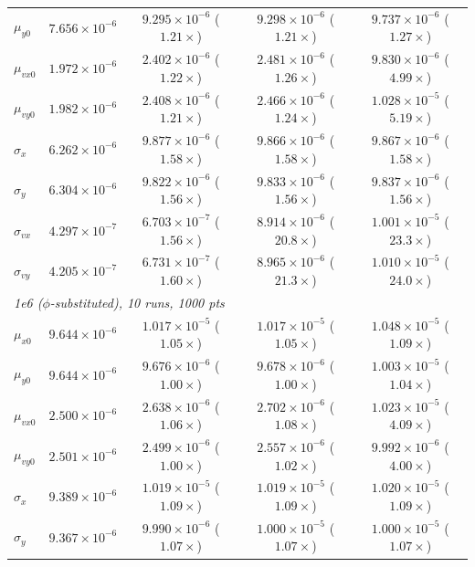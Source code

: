 \documentclass[11pt,a4paper]{article}
\begin{document}
\begin{table}[h]
\begin{tabular}{lcccc}
$\mu_{y0}$    & $7.656\times10^{-6}$ & $9.295\times10^{-6}$ ($1.21\times$) & $9.298\times10^{-6}$ ($1.21\times$) & $9.737\times10^{-6}$ ($1.27\times$) \\
$\mu_{vx0}$   & $1.972\times10^{-6}$ & $2.402\times10^{-6}$ ($1.22\times$) & $2.481\times10^{-6}$ ($1.26\times$) & $9.830\times10^{-6}$ ($\mathbf{4.99\times}$) \\
$\mu_{vy0}$   & $1.982\times10^{-6}$ & $2.408\times10^{-6}$ ($1.21\times$) & $2.466\times10^{-6}$ ($1.24\times$) & $1.028\times10^{-5}$ ($\mathbf{5.19\times}$) \\
$\sigma_x$    & $6.262\times10^{-6}$ & $9.877\times10^{-6}$ ($1.58\times$) & $9.866\times10^{-6}$ ($1.58\times$) & $9.867\times10^{-6}$ ($1.58\times$) \\
$\sigma_y$    & $6.304\times10^{-6}$ & $9.822\times10^{-6}$ ($1.56\times$) & $9.833\times10^{-6}$ ($1.56\times$) & $9.837\times10^{-6}$ ($1.56\times$) \\
$\sigma_{vx}$ & $4.297\times10^{-7}$ & $6.703\times10^{-7}$ ($1.56\times$) & $8.914\times10^{-6}$ ($\mathbf{20.8\times}$) & $1.001\times10^{-5}$ ($\mathbf{23.3\times}$) \\
$\sigma_{vy}$ & $4.205\times10^{-7}$ & $6.731\times10^{-7}$ ($1.60\times$) & $8.965\times10^{-6}$ ($\mathbf{21.3\times}$) & $1.010\times10^{-5}$ ($\mathbf{24.0\times}$) \\
\midrule
\multicolumn{5}{l}{\emph{1e6 ($\phi$-substituted), 10 runs, 1000 pts}} \\
$\mu_{x0}$    & $9.644\times10^{-6}$ & $1.017\times10^{-5}$ ($1.05\times$) & $1.017\times10^{-5}$ ($1.05\times$) & $1.048\times10^{-5}$ ($1.09\times$) \\
$\mu_{y0}$    & $9.644\times10^{-6}$ & $9.676\times10^{-6}$ ($1.00\times$) & $9.678\times10^{-6}$ ($1.00\times$) & $1.003\times10^{-5}$ ($1.04\times$) \\
$\mu_{vx0}$   & $2.500\times10^{-6}$ & $2.638\times10^{-6}$ ($1.06\times$) & $2.702\times10^{-6}$ ($1.08\times$) & $1.023\times10^{-5}$ ($\mathbf{4.09\times}$) \\
$\mu_{vy0}$   & $2.501\times10^{-6}$ & $2.499\times10^{-6}$ ($1.00\times$) & $2.557\times10^{-6}$ ($1.02\times$) & $9.992\times10^{-6}$ ($\mathbf{4.00\times}$) \\
$\sigma_x$    & $9.389\times10^{-6}$ & $1.019\times10^{-5}$ ($1.09\times$) & $1.019\times10^{-5}$ ($1.09\times$) & $1.020\times10^{-5}$ ($1.09\times$) \\
$\sigma_y$    & $9.367\times10^{-6}$ & $9.990\times10^{-6}$ ($1.07\times$) & $1.000\times10^{-5}$ ($1.07\times$) & $1.000\times10^{-5}$ ($1.07\times$) \\

\end{tabular}
\end{table}
\end{document}
